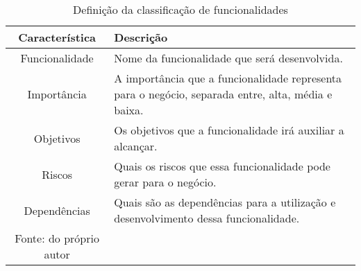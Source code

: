       \begin{table}[h!]
        \centering
        \label{Tabela:1}
        \caption{Definição da classificação de funcionalidades}
        \begin{tabular}{c p{9cm}}
          \hline
          \textbf{Característica} &
          \textbf{Descrição} \\
          \hline
          Funcionalidade &
          Nome da funcionalidade que será desenvolvida. \\
          Importância &
          A importância que a funcionalidade representa para o negócio, separada
          entre, alta, média e baixa. \\
          Objetivos &
          Os objetivos que a funcionalidade irá auxiliar a alcançar. \\
          Riscos &
          Quais os riscos que essa funcionalidade pode gerar para o negócio. \\
          Dependências &
          Quais são as dependências para a utilização e desenvolvimento dessa
          funcionalidade. \\ \hline
          \newline
          \small{Fonte: do próprio autor}
        \end{tabular}
      \end{table}

